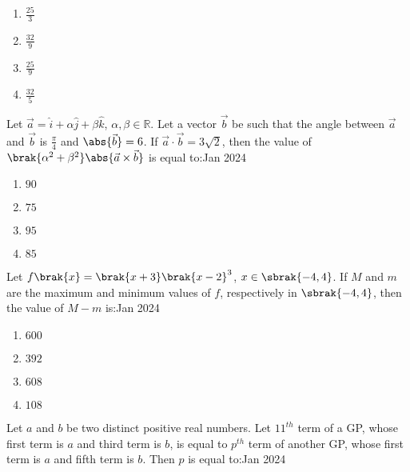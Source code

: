         \begin{multicols}{4}
        \begin{enumerate}
        \item $\frac{25}{3}$
        \item $\frac{32}{9}$
        \item $\frac{25}{9}$
        \item $\frac{32}{5}$
        \end{enumerate}
        \end{multicols}

    \item Let $\vec{a}=\hat{i}+\alpha\hat{j}+\beta\hat{k}$, $\alpha,\beta\in\mathbb{R}$. Let a vector $\vec{b}$ be such that the angle between $\vec{a}$ and $\vec{b}$ is $\frac{\pi}{4}$ and $\abs{\vec{b}}=6$. If $\vec{a}\cdot\vec{b}=3\sqrt{2}$, then the value of $\brak{\alpha^{2}+\beta^{2}}\abs{\vec{a}\times\vec{b}}$ is equal to:\hfill{Jan 2024}

        \begin{multicols}{4}
        \begin{enumerate}
        \item $90$
        \item $75$
        \item $95$
        \item $85$
        \end{enumerate}
        \end{multicols}
        
    \item Let $f\brak{x}=\brak{x+3}\brak{x-2}^{3}$, $x\in\sbrak{-4,4}$. If $M$ and $m$ are the maximum and minimum values of $f$, respectively in $\sbrak{-4,4}$, then the value of $M-m$ is:\hfill{Jan 2024}

        \begin{multicols}{4}
        \begin{enumerate}
        \item $600$
        \item $392$
        \item $608$
        \item $108$
        \end{enumerate}
        \end{multicols}

    \item Let $a$ and $b$ be two distinct positive real numbers. Let $11^{th}$ term of a GP, whose first term is $a$ and third term is $b$, is equal to $p^{th}$ term of another GP, whose first term is $a$ and fifth term is $b$. Then $p$ is equal to:\hfill{Jan 2024}

